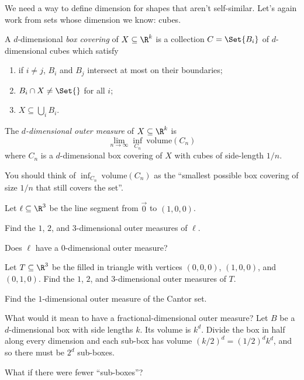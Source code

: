 	\newpage
	We need a way to define dimension for shapes that aren't self-similar. Let's again work from
	sets whose dimension we know: cubes.

	\begin{definition}
		A $d$-dimensional \emph{box covering} of $X\subseteq \R^k$ is a collection $C=\Set{B_i}$ of 
		$d$-dimensional cubes which satisfy
		\begin{enumerate}
			\item if $i\neq j$, $B_i$ and $B_j$ intersect at most on their boundaries;
			\item $B_i\cap X\neq \Set{}$ for all $i$;
			\item $X\subseteq \bigcup_{i} B_i$.
		\end{enumerate}
	\end{definition}

	\begin{definition}
		The \emph{$d$-dimensional outer measure} of $X\subseteq \R^k$ is
		\[
			\lim_{n\to\infty} \inf_{C_n}\  \text{volume}(C_n)
		\]
		where $C_n$ is a $d$-dimensional box covering of $X$ with cubes of side-length $1/n$.
	\end{definition}
	You should think of $\inf_{C_n}\  \text{volume}(C_n)$ as the ``smallest possible box covering of size $1/n$ that
	still covers the set''.

	\question
	Let $\ell\subseteq \R^3$ be the line segment from $\vec 0$ to $(1,0,0)$.
	\begin{parts}
		\item Find the $1$, $2$, and $3$-dimensional outer measures of $\ell$.
		\item Does $\ell$ have a $0$-dimensional outer measure?
		\item Let $T\subseteq \R^3$ be the filled in triangle with vertices $(0,0,0)$, $(1,0,0)$,
			and $(0,1,0)$. Find the $1$, $2$, and $3$-dimensional outer measures of $T$.
		\item Find the $1$-dimensional outer measure of the Cantor set.
	\end{parts}

	\newpage
	What would it mean to have a fractional-dimensional outer measure? Let $B$ be a $d$-dimensional
	box with side lengths $k$. Its volume is $k^d$. Divide the box in half along every dimension and 
	each sub-box has volume $(k/2)^d=(1/2)^dk^d$, and so there must be $2^d$ sub-boxes.

	What if there were fewer ``sub-boxes''?

